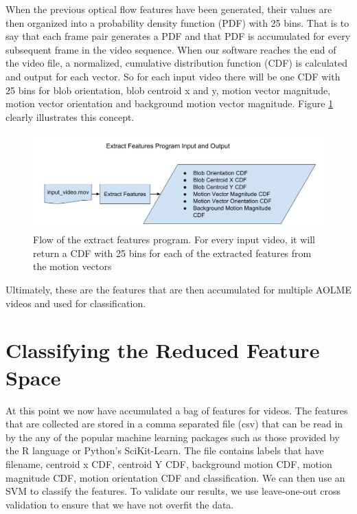 When the previous optical flow features have been generated, their values are
then organized into a probability density function (PDF) with 25 bins. That is
to say that each frame pair generates a PDF and that PDF is accumulated for
every subsequent frame in the video sequence. When our software reaches the end
of the video file, a normalized, cumulative distribution function (CDF) is
calculated and output for each vector. So for each input video there will be one
CDF with 25 bins for blob orientation, blob centroid x and y, motion vector
magnitude, motion vector orientation and background motion vector magnitude.
Figure \ref{fig:extract_flow} clearly illustrates this concept.

\begin{figure}[h]
  \centering
  \includegraphics[width=\textwidth]{figures/extract_features_flow}
  \caption{Flow of the extract features program. For every input video, it will
  return a CDF with 25 bins for each of the extracted features from the motion
  vectors}
  \label{fig:extract_flow}
\end{figure}

Ultimately, these are the features that are then accumulated for multiple AOLME
videos and used for classification.

\section{\label{section:classification}Classifying the Reduced Feature Space}
At this point we now have accumulated a bag of features for videos. The features
that are collected are stored in a comma separated file (csv) that can be read
in by the any of the popular machine learning packages such as those provided
by the R language or Python's SciKit-Learn. The file contains labels that have
filename, centroid x CDF, centroid Y CDF, background motion CDF, motion magnitude
CDF, motion orientation CDF and classification. We can then use an SVM to classify
the features. To validate our results, we use leave-one-out cross validation
to ensure that we have not overfit the data.

